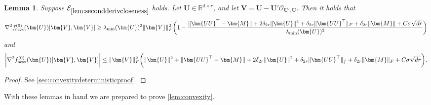 \documentclass[10pt]{article}
\renewcommand{\t}{^{\top}}
\newtheorem{lemma}{Lemma}
\theoremstyle{definition}
\begin{document}
\begin{lemma} \label{lem:convexitydeterministic}
   Suppose  $\mathcal{E}_{\cref{lem:secondderivcloseness}}$ holds.  
  Let $\bm{U} \in \mathbb{R}^{d\times r}$, and let $\bm{V}= \bm{U} - \bm{U}' \mathcal{O}_{\bm{U}',\bm{U}}$.  Then 
    it holds that
\begin{align}
    \nabla^2 f^{(0)}_{{\sf ncvx}} (\bm{U})[ \bm{V},\bm{V}] \geq  \lambda_{\min}(\bm{U})^2\| \bm{V}\|_F^2 \bigg( 1  - \frac{\| \bm{UU}\t - \bm{M}\| + 2 \delta_{2r} \|\bm{U}\|^2 + \delta_{2r} \| \bm{UU}\t \|_F + \delta_{2r} \| \bm{M} \| + C \sigma \sqrt{dr}}{\lambda_{\min}(\bm{U})^2} \bigg)
\end{align}
and 
\begin{align}
    \bigg| \nabla^2 f^{(0)}_{{\sf ncvx}}(\bm{U})[\bm{V},\bm{V}] \bigg| \leq \|\bm{V}\|_F^2 \bigg( \| \bm{U}\|^2 + \| \bm{UU}\t - \bm{M} \| + 2 \delta_{2r} \| \bm{U}\|^2 + \delta_{2r} \| \bm{UU}\t \|_f + \delta_{2r} \| \bm{M} \|_F + C \sigma \sqrt{dr} \bigg).
\end{align}
\end{lemma}
\begin{proof}
    See \cref{sec:convexitydeterministicproof}.
\end{proof}



With these lemmas in hand we are prepared to prove \cref{lem:convexity}. 
\end{document}
